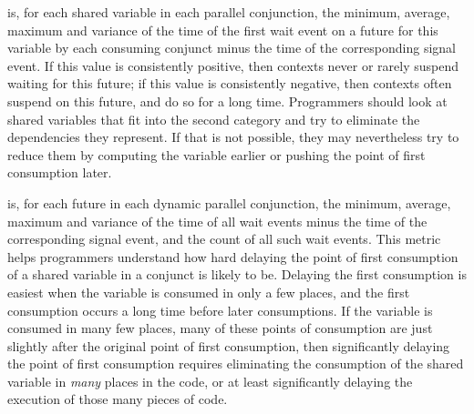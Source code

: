 is,
for each shared variable in each parallel conjunction,
the minimum, average, maximum and variance of the time
of the first wait event on a future for this variable
by each consuming conjunct
minus the time of the corresponding signal event.
If this value is consistently positive,
then contexts never or rarely suspend waiting for this future;
if this value is consistently negative,
then contexts often suspend on this future, and do so for a long time.
Programmers should look at shared variables
that fit into the second category
and try to eliminate the dependencies they represent.
If that is not possible, they may nevertheless try to reduce them
by computing the variable earlier
or pushing the point of first consumption later.

is, for each future in each dynamic parallel conjunction,
the minimum, average, maximum and variance of the time
of all wait events minus the time of the corresponding signal event,
and the count of all such wait events.
This metric helps programmers understand how hard
delaying the point of first consumption of a shared variable in a conjunct
is likely to be.
Delaying the first consumption is easiest
when the variable is consumed in only a few places,
and the first consumption occurs a long time before later consumptions.
If the variable is consumed in many few places,
many of these points of consumption are just slightly after
the original point of first consumption,
then significantly delaying the point of first consumption
requires eliminating the consumption of the shared variable
in \emph{many} places in the code,
or at least significantly delaying the execution
of those many pieces of code.


